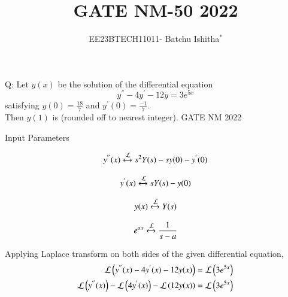 \documentclass[journal,12pt,twocolumn]{IEEEtran}
\theoremstyle{remark}
\begin{document}
\let\vec\mathbf



\title{ GATE NM-50 2022}
\author{EE23BTECH11011- Batchu Ishitha$^{*}$%
}
\maketitle




\bigskip

\renewcommand{\thefigure}{\theenumi}
\renewcommand{\thetable}{\theenumi}

Q:  Let $y(x)$ be the solution of the differential equation 
$$y^{''} - 4y^{'} -12y = 3e^{5x}$$
satisfying $y(0)=\frac{18}{7}$ and $y^{'}(0)=\frac{-1}{7}$. \\
Then $y(1)$ is \underline{\hspace{2.5cm}}  (rounded off to nearest integer).      \hfill{GATE NM 2022 }

\solution
\begin{table}[!ht]    
    \centering
    \resizebox{9cm}{1cm}{
         
    }
    \caption{Input Parameters}
    \label{table:ishitha.g22.nm.50.t1}
\end{table}

\begin{equation}
y^{''}(x) \xleftrightarrow{\mathcal{L}}   s^{2}Y(s)-sy(0)-y^{'}(0) \\ \label{eq:ishitha.g22.nm.50.1.eq}
\end{equation}

\begin{equation}
y^{'}(x)  \xleftrightarrow{\mathcal{L}}   sY(s)-y(0) \\ \label{eq:ishitha.g22.nm.50.2.eq}
\end{equation}

\begin{equation}
y(x)     \xleftrightarrow{\mathcal{L}}   Y(s) \\ \label{eq:ishitha.g22.nm.50.3.eq}
\end{equation}

\begin{equation}
e^{ax}    \xleftrightarrow {\mathcal{L}} \frac{1}{s-a} \\ \label{eq:ishitha.g22.nm.50.4.eq}
\end{equation}

Applying Laplace transform on both sides of the given differential equation,
\begin{align}
\mathcal{L}\left(y^{''}(x) - 4y^{'}(x) -12y(x)\right)&=\mathcal{L}\left(3e^{5x}\right)\\
\mathcal{L}\left(y^{''}(x)\right) - \mathcal{L}\left(4y^{'}(x)\right) - \mathcal{L}\left(12y(x)\right) &= \mathcal{L}\left(3e^{5x}\right)
\end{align}
\end{document}
